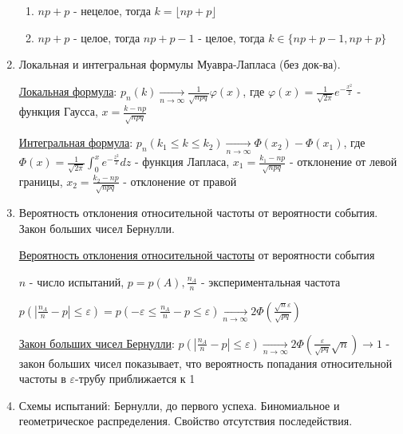 \begin{enumerate}
\begin{enumerate}
        \item $np + p$ - нецелое, тогда $k = \lfloor np + p \rfloor$

        \item $np + p$ - целое, тогда $np + p - 1$ - целое, тогда $k \in \{np + p - 1, np + p\}$
    \end{enumerate}

    \item Локальная и интегральная формулы Муавра-Лапласа (без док-ва).

    \hyperlink{localformulademoivrelaplace}{Локальная формула}: $p_n(k) \underset{n \to \infty}{\longrightarrow} \frac{1}{\sqrt{npq}} \varphi(x)$, где $\varphi(x) = \frac{1}{\sqrt{2\pi}} e^{-\frac{x^2}{2}}$ - функция Гаусса, 
    $x = \frac{k - np}{\sqrt{npq}}$

    \hyperlink{integralformulademoivrelaplace}{Интегральная формула}: $p_n(k_1 \leq k \leq k_2) \underset{n \to \infty}{\longrightarrow} \Phi(x_2) - \Phi(x_1)$, где $\Phi(x) = \frac{1}{\sqrt{2\pi}} \int_0^x e^{-\frac{z^2}{2}} dz$ - функция Лапласа,
    $x_1 = \frac{k_1 - np}{\sqrt{npq}}$ - отклонение от левой границы, $x_2 = \frac{k_2 - np}{\sqrt{npq}}$ - отклонение от правой

    \item Вероятность отклонения относительной частоты от вероятности события. Закон больших чисел Бернулли.

    \hyperlink{probabilityofdeviation}{Вероятность отклонения относительной частоты} от вероятности события

    $n$ - число испытаний, $p = p(A), \frac{n_A}{n}$ - экспериментальная частота

    $p\left(|\frac{n_A}{n} - p| \leq \varepsilon\right) = p\left(-\varepsilon \leq \frac{n_A}{n} - p \leq \varepsilon\right) \underset{n \to \infty}{\longrightarrow} 2\Phi\left(\frac{\sqrt{n}\varepsilon}{\sqrt{pq}}\right)$

    \hyperlink{lawofbignumbersbernoulli}{Закон больших чисел Бернулли}: $p\left(|\frac{n_A}{n} - p| \leq \varepsilon\right) \underset{n \to \infty}{\longrightarrow} 2 \Phi\left(\frac{\varepsilon}{\sqrt{pq}}\sqrt{n}\right) \to 1$ - 
    закон больших чисел показывает, что вероятность попадания относительной частоты в $\varepsilon$-трубу приближается к 1

    \item Схемы испытаний: Бернулли, до первого успеха. Биномиальное и геометрическое распределения. Свойство отсутствия последействия.


\end{enumerate}
